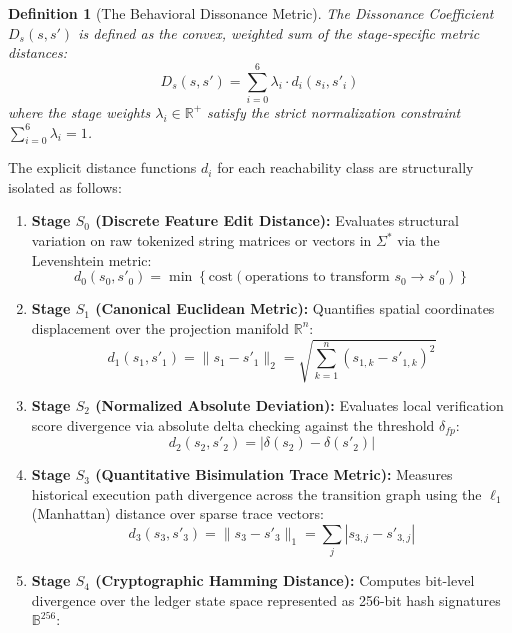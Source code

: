 \documentclass[11pt,a4paper]{article}
\newtheorem{definition}[theorem]{Definition}
\begin{document}
\begin{definition}[The Behavioral Dissonance Metric]
The Dissonance Coefficient $D_s(s, s')$ is defined as the convex, weighted sum of the stage-specific metric distances:
\begin{equation}
    D_s(s, s') = \sum_{i=0}^{6} \lambda_i \cdot d_i(s_i, s'_i)
\end{equation}
where the stage weights $\lambda_i \in \mathbb{R}^+$ satisfy the strict normalization constraint $\sum_{i=0}^{6} \lambda_i = 1$.
\end{definition}

The explicit distance functions $d_i$ for each reachability class are structurally isolated as follows:
\begin{enumerate}
    \item \textbf{Stage $S_0$ (Discrete Feature Edit Distance):} Evaluates structural variation on raw tokenized string matrices or vectors in $\Sigma^*$ via the Levenshtein metric:
    \begin{equation}
        d_0(s_0, s'_0) = \min \left\{ \text{cost}(\text{operations to transform } s_0 \to s'_0) \right\}
    \end{equation}
    \item \textbf{Stage $S_1$ (Canonical Euclidean Metric):} Quantifies spatial coordinates displacement over the projection manifold $\mathbb{R}^n$:
    \begin{equation}
        d_1(s_1, s'_1) = \| s_1 - s'_1 \|_2 = \sqrt{\sum_{k=1}^{n} (s_{1,k} - s'_{1,k})^2}
    \end{equation}
    \item \textbf{Stage $S_2$ (Normalized Absolute Deviation):} Evaluates local verification score divergence via absolute delta checking against the threshold $\delta_{fp}$:
    \begin{equation}
        d_2(s_2, s'_2) = | \delta(s_2) - \delta(s'_2) |
    \end{equation}
    \item \textbf{Stage $S_3$ (Quantitative Bisimulation Trace Metric):} Measures historical execution path divergence across the transition graph using the $\ell_1$ (Manhattan) distance over sparse trace vectors:
    \begin{equation}
        d_3(s_3, s'_3) = \| s_3 - s'_3 \|_1 = \sum_{j} |s_{3,j} - s'_{3,j}|
    \end{equation}
    \item \textbf{Stage $S_4$ (Cryptographic Hamming Distance):} Computes bit-level divergence over the ledger state space represented as 256-bit hash signatures $\mathbb{B}^{256}$:

\end{enumerate}
\end{document}

